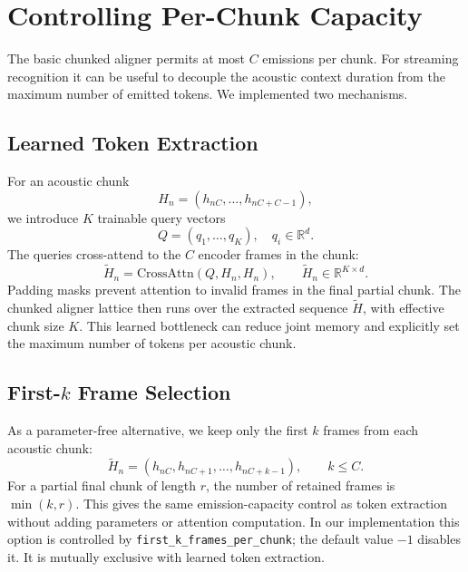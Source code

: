 \documentclass[conference]{IEEEtran}
\begin{document}
\section{Controlling Per-Chunk Capacity}

The basic chunked aligner permits at most $C$ emissions per chunk. For streaming
recognition it can be useful to decouple the acoustic context duration from the
maximum number of emitted tokens. We implemented two mechanisms.

\subsection{Learned Token Extraction}

For an acoustic chunk
\begin{equation}
  H_n = (h_{nC}, \ldots, h_{nC+C-1}),
\end{equation}
we introduce $K$ trainable query vectors
\begin{equation}
  Q = (q_1, \ldots, q_K), \quad q_i \in \mathbb{R}^d.
\end{equation}
The queries cross-attend to the $C$ encoder frames in the chunk:
\begin{equation}
  \tilde{H}_n = \mathrm{CrossAttn}(Q, H_n, H_n),
  \qquad \tilde{H}_n \in \mathbb{R}^{K \times d}.
\end{equation}
Padding masks prevent attention to invalid frames in the final partial chunk.
The chunked aligner lattice then runs over the extracted sequence
$\tilde{H}$, with effective chunk size $K$. This learned bottleneck can reduce
joint memory and explicitly set the maximum number of tokens per acoustic chunk.

\subsection{First-$k$ Frame Selection}

As a parameter-free alternative, we keep only the first $k$ frames from each
acoustic chunk:
\begin{equation}
  \tilde{H}_n = (h_{nC}, h_{nC+1}, \ldots, h_{nC+k-1}),
  \qquad k \le C.
\end{equation}
For a partial final chunk of length $r$, the number of retained frames is
$\min(k,r)$. This gives the same emission-capacity control as token extraction
without adding parameters or attention computation. In our implementation this
option is controlled by \texttt{first\_k\_frames\_per\_chunk}; the default value
$-1$ disables it. It is mutually exclusive with learned token extraction.
\end{document}
